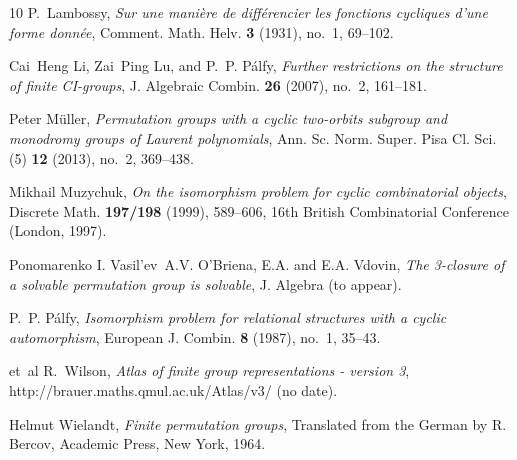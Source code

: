 \documentclass[11pt]{amsart}
\numberwithin{equation}{section}
\theoremstyle{definition}
\begin{document}
\begin{thebibliography}{10}
P.~Lambossy, \emph{Sur une mani\`ere de diff\'erencier les fonctions cycliques
  d'une forme donn\'ee}, Comment. Math. Helv. \textbf{3} (1931), no.~1,
  69--102. 

Cai~Heng Li, Zai~Ping Lu, and P.~P. P{\'a}lfy, \emph{Further restrictions on
  the structure of finite {CI}-groups}, J. Algebraic Combin. \textbf{26}
  (2007), no.~2, 161--181. 

Peter M\"{u}ller, \emph{Permutation groups with a cyclic two-orbits subgroup
  and monodromy groups of {L}aurent polynomials}, Ann. Sc. Norm. Super. Pisa
  Cl. Sci. (5) \textbf{12} (2013), no.~2, 369--438. 

Mikhail Muzychuk, \emph{On the isomorphism problem for cyclic combinatorial
  objects}, Discrete Math. \textbf{197/198} (1999), 589--606, 16th British
  Combinatorial Conference (London, 1997). 

Ponomarenko I. Vasil'ev~A.V. O'Briena, E.A. and E.A. Vdovin, \emph{The
  3-closure of a solvable permutation group is solvable}, J. Algebra (to
  appear).

P.~P. P{\'a}lfy, \emph{Isomorphism problem for relational structures with a
  cyclic automorphism}, European J. Combin. \textbf{8} (1987), no.~1, 35--43.

et~al R.~Wilson, \emph{Atlas of finite group representations - version 3},
  http://brauer.maths.qmul.ac.uk/Atlas/v3/ (no date).

Helmut Wielandt, \emph{Finite permutation groups}, Translated from the German
  by R. Bercov, Academic Press, New York, 1964. 

\end{thebibliography}
    
	
	
	
\end{document}
